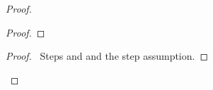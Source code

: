 \documentclass[fleqn,leqno]{article}
\begin{document}
\begin{proof}
\begin{proof}

\end{proof}
\qedstep
\begin{proof}
\pf\ Steps  and  and the step  assumption.
\end{proof}
\end{proof}
\end{document}
